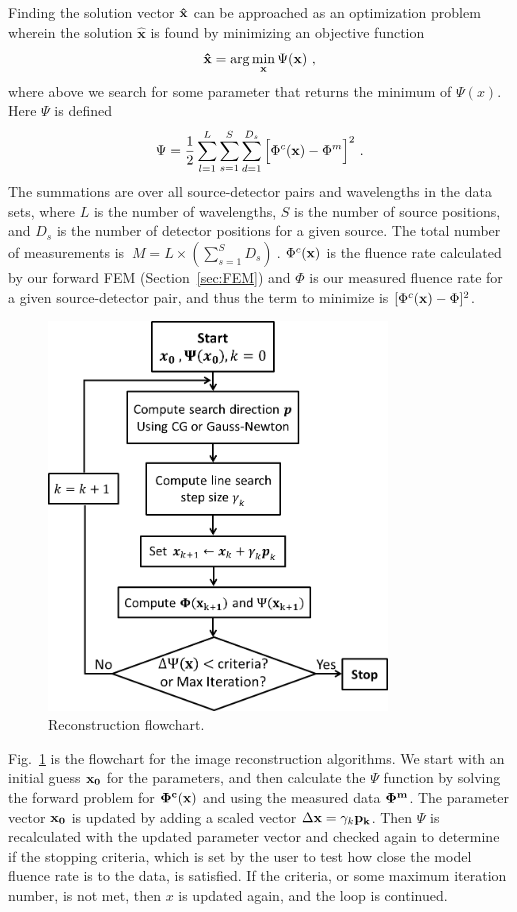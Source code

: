 Finding the solution vector $\mathbf{\hat{x}}$ can be approached as an optimization problem \cite{Arridge1998,Schweiger2005} wherein the solution $\mathbf{\hat{x}}$ is found by minimizing an objective function
%
\begin{equation}
\mathbf{\hat{x}} = \arg \min_{\mathbf{x}} \Psi(\mathbf{x}) \ ,
\end{equation}
\noindent
where above we search for some parameter  that returns the minimum of $\Psi(x)$. Here $\Psi$ is defined
%
\begin{equation}
\label{eqn:Psi}
\Psi = \frac{1}{2}\sum_{l=1}^L\sum_{s=1}^S\sum_{d=1}^{D_s}\Big[\Phi^c(\mathbf{x})-\Phi^m\Big]^2 \ .
\end{equation}
\noindent
The summations are over all source-detector pairs and wavelengths in the data sets, where $L$ is the number of wavelengths, $S$ is the number of source positions, and $D_s$ is the number of detector positions for a given source. The total number of measurements is $\ M=L\times(\sum_{s=1}^S D_s)\ $. $\Phi^c(\mathbf{x})$ is the fluence rate calculated by our forward FEM (Section~\ref{sec:FEM}) and $\Phi$ is our measured fluence rate for a given source-detector pair, and thus the term to minimize is $[\Phi^c(\mathbf{x})-\Phi]^2$.
%
\begin{figure}[h]
\centering
\includegraphics[width=9cm]{./figures/2_Theory/reconflow.png}
\caption{Reconstruction flowchart.}
\label{fig:reconflow}
\end{figure}
%
Fig.~\ref{fig:reconflow} is the flowchart for the image reconstruction algorithms. We start with an initial guess $\mathbf{x_0}$ for the parameters, and then calculate the $\Psi$ function by solving the forward problem for $\mathbf{\Phi^c(x)}$ and using the measured data $\mathbf{\Phi^m}$. The parameter vector $\mathbf{x_0}$ is updated by adding a scaled vector $\Delta \mathbf{x} = \gamma_k\mathbf{p_k}$. Then $\Psi$ is recalculated with the updated parameter vector and checked again to determine if the stopping criteria, which is set by the user to test how close the model fluence rate is to the data, is satisfied. If the criteria, or some maximum iteration number, is not met, then $x$ is updated again, and the loop is continued.

